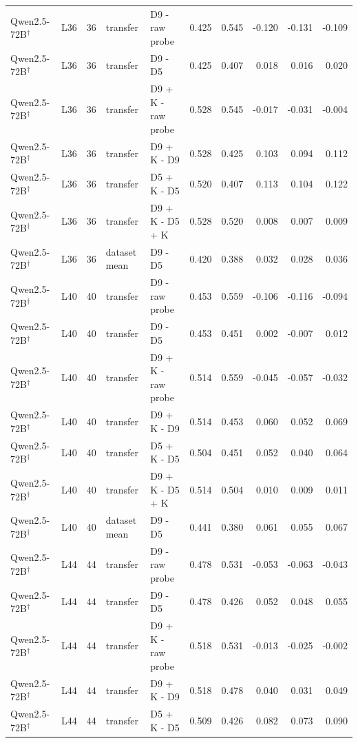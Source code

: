 \begin{table}
{\begin{tabular}{llrllrrrrr}
Qwen2.5-72B$^\dagger$ & L36 & 36 & transfer & D9 - raw probe & 0.425 & 0.545 & -0.120 & -0.131 & -0.109 \\
Qwen2.5-72B$^\dagger$ & L36 & 36 & transfer & D9 - D5 & 0.425 & 0.407 & 0.018 & 0.016 & 0.020 \\
Qwen2.5-72B$^\dagger$ & L36 & 36 & transfer & D9 + K - raw probe & 0.528 & 0.545 & -0.017 & -0.031 & -0.004 \\
Qwen2.5-72B$^\dagger$ & L36 & 36 & transfer & D9 + K - D9 & 0.528 & 0.425 & 0.103 & 0.094 & 0.112 \\
Qwen2.5-72B$^\dagger$ & L36 & 36 & transfer & D5 + K - D5 & 0.520 & 0.407 & 0.113 & 0.104 & 0.122 \\
Qwen2.5-72B$^\dagger$ & L36 & 36 & transfer & D9 + K - D5 + K & 0.528 & 0.520 & 0.008 & 0.007 & 0.009 \\
Qwen2.5-72B$^\dagger$ & L36 & 36 & dataset mean & D9 - D5 & 0.420 & 0.388 & 0.032 & 0.028 & 0.036 \\
Qwen2.5-72B$^\dagger$ & L40 & 40 & transfer & D9 - raw probe & 0.453 & 0.559 & -0.106 & -0.116 & -0.094 \\
Qwen2.5-72B$^\dagger$ & L40 & 40 & transfer & D9 - D5 & 0.453 & 0.451 & 0.002 & -0.007 & 0.012 \\
Qwen2.5-72B$^\dagger$ & L40 & 40 & transfer & D9 + K - raw probe & 0.514 & 0.559 & -0.045 & -0.057 & -0.032 \\
Qwen2.5-72B$^\dagger$ & L40 & 40 & transfer & D9 + K - D9 & 0.514 & 0.453 & 0.060 & 0.052 & 0.069 \\
Qwen2.5-72B$^\dagger$ & L40 & 40 & transfer & D5 + K - D5 & 0.504 & 0.451 & 0.052 & 0.040 & 0.064 \\
Qwen2.5-72B$^\dagger$ & L40 & 40 & transfer & D9 + K - D5 + K & 0.514 & 0.504 & 0.010 & 0.009 & 0.011 \\
Qwen2.5-72B$^\dagger$ & L40 & 40 & dataset mean & D9 - D5 & 0.441 & 0.380 & 0.061 & 0.055 & 0.067 \\
Qwen2.5-72B$^\dagger$ & L44 & 44 & transfer & D9 - raw probe & 0.478 & 0.531 & -0.053 & -0.063 & -0.043 \\
Qwen2.5-72B$^\dagger$ & L44 & 44 & transfer & D9 - D5 & 0.478 & 0.426 & 0.052 & 0.048 & 0.055 \\
Qwen2.5-72B$^\dagger$ & L44 & 44 & transfer & D9 + K - raw probe & 0.518 & 0.531 & -0.013 & -0.025 & -0.002 \\
Qwen2.5-72B$^\dagger$ & L44 & 44 & transfer & D9 + K - D9 & 0.518 & 0.478 & 0.040 & 0.031 & 0.049 \\
Qwen2.5-72B$^\dagger$ & L44 & 44 & transfer & D5 + K - D5 & 0.509 & 0.426 & 0.082 & 0.073 & 0.090 \\

\end{tabular}}
\end{table}
